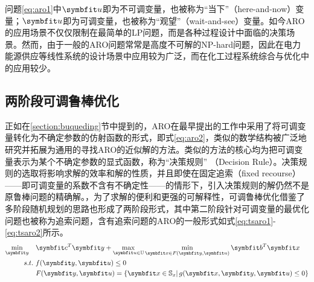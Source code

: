 问题\eqref{eq:aro1}中$\symbfit u$即为不可调变量，也被称为“当下”（here-and-now）变量；$\symbfit u$即为可调变量，也被称为“观望”（wait-and-see）变量\cite{bental2004}。如今ARO的应用场景不仅仅限制在最简单的LP问题，而是各种过程设计中面临的决策场景。然而，由于一般的ARO问题常常是高度不可解的NP-hard问题，因此在电力能源供应等线性系统的设计场景中应用较为广泛\cite{zugno2016,moreira2015, zhang2016, nan2023}，而在化工过程系统综合与优化中的应用较少。

\subsection{两阶段可调鲁棒优化}

正如在\ref{section:buqueding}节中提到的，ARO在最早提出的工作中采用了将可调变量转化为不确定参数的仿射函数的形式，即式\eqref{eq:aro2}，类似的数学结构被广泛地研究并拓展为通用的寻找ARO的近似解的方法。类似的方法的核心均为把可调变量表示为某个不确定参数的显式函数，称为“决策规则” （Decision Rule）。决策规则的选取将影响求解的效率和解的性质，并且即使在固定追索（fixed recourse）——即可调变量的系数不含有不确定性——的情形下，引入决策规则的解仍然不是原鲁棒问题的精确解。，为了求解的便利和更强的可解释性，可调鲁棒优化借鉴了多阶段随机规划的思路也形成了两阶段形式，其中第二阶段针对可调变量的最优化问题也被称为追索问题，含有追索问题的ARO的一般形式如式\eqref{eq:tsaro1}-\eqref{eq:tsaro2}所示。
 \begin{align}
   \min_{\symbfit y}\quad &\symbfit c^T\symbfit y + \max_{\symbfit u\in\mathbb U} \min_{\symbfit x\in \mathit F(\symbfit y, \symbfit u)} \symbfit b^T \symbfit x \label{eq:tsaro1}\\
    s.t.\ & f(\symbfit y,\symbfit u) \le 0 \\
    & \mathit F(\symbfit y, \symbfit u) = \left\{ \symbfit x\in \mathbb S_x\right | g(\symbfit x, \symbfit y, \symbfit u) \le 0\} \label{eq:tsaro2}
 \end{align}


